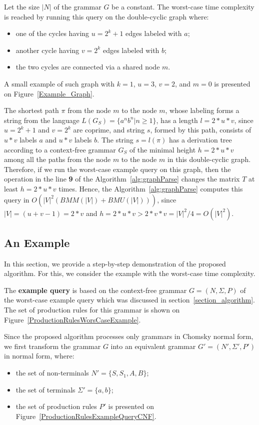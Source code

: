 Let the size $|N|$ of the grammar $G$ be a constant. The worst-case time complexity is reached by running this query on the double-cyclic graph where:
\begin{itemize}
	\item one of the cycles having $u = 2^k + 1$ edges labeled with $a$;
	\item another cycle having $v = 2^k$ edges labeled with $b$;
	\item the two cycles are connected via a shared node $m$.
\end{itemize}

A small example of such graph with $k = 1$, $u = 3$, $v = 2$, and $m = 0$ is presented on Figure~\ref{Example_Graph}.

The shortest path $\pi$ from the node $m$ to the node $m$, whose labeling forms a string from the language $L(G_S)=\{a^n b^n| n \geq 1\}$, has a length $l = 2*u*v$, since $u = 2^k + 1$ and $v = 2^k$ are coprime, and string $s$, formed by this path, consists of $u*v$ labels $a$ and $u*v$ labels $b$. The string $s = l(\pi)$ has a derivation tree according to a context-free grammar $G_S$ of the minimal height $h = 2*u*v$ among all the paths from the node $m$ to the node $m$ in this double-cyclic graph. Therefore, if we run the worst-case example query on this graph, then the operation in the line \textbf{9} of the Algorithm~\ref{alg:graphParse} changes the matrix $T$ at least $h = 2*u*v$ times. Hence, the Algorithm~\ref{alg:graphParse} computes this query in $O(|V|^2(BMM(|V|) + BMU(|V|)))$, since $|V| = (u + v - 1) = 2*v$ and $h = 2*u*v > 2*v*v = |V|^2 / 4 = O(|V|^2)$.

\subsection{An Example}
\label{section_example}

In this section, we provide a step-by-step demonstration of the proposed algorithm. For this, we consider the example with the worst-case time complexity.

The \textbf{example query} is based on the context-free grammar $G = (N, \Sigma, P)$ of the worst-case example query which was discussed in section~\ref{section_algorithm}. The set of production rules for this grammar is shown on Figure~\ref{ProductionRulesWorsCaseExample}.

Since the proposed algorithm processes only grammars in Chomsky normal form, we first transform the grammar $G$ into an equivalent grammar $G' = (N', \Sigma', P')$ in normal form, where:
\begin{itemize}
    \item the set of non-terminals $N' = \{S, S_1, A, B\}$;
    \item the set of terminals $\Sigma' = \{a, b\}$;
    \item the set of production rules $P'$ is presented on Figure~\ref{ProductionRulesExampleQueryCNF}.
\end{itemize}


